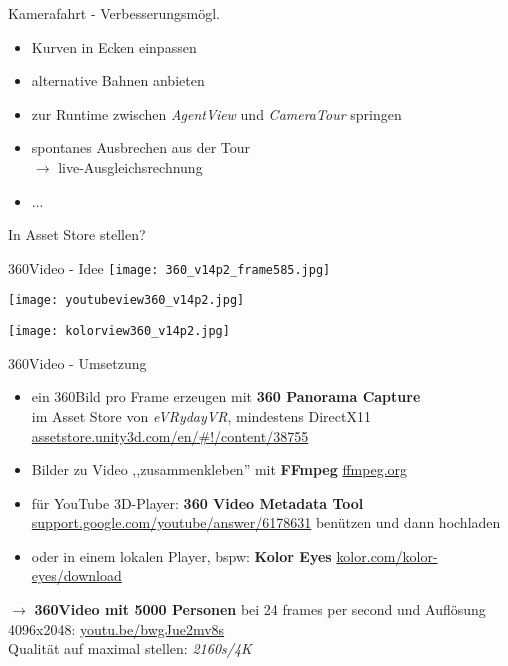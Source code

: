 
\begin{frame}{Kamerafahrt - Verbesserungsmögl.}
	\begin{itemize}
	\setlength\itemsep{1em}
		\pause\item Kurven in Ecken einpassen
		\pause\item alternative Bahnen anbieten
		\pause\item zur Runtime zwischen \textit{AgentView} und \textit{CameraTour} springen
		\pause\item spontanes Ausbrechen aus der Tour\\\pause $\rightarrow$ live-Ausgleichsrechnung
		\pause\item ...
	\end{itemize}
\vspace{0.4cm}
\pause In Asset Store stellen?
\end{frame}


\begin{frame}{360\degree Video - Idee}
	\pause\texttt{[image: 360\_v14p2\_frame585.jpg]}\\
	\begin{minipage}{0.45\textwidth}
			\pause\texttt{[image: youtubeview360\_v14p2.jpg]}
	\end{minipage}\hfill
	\begin{minipage}{0.45\textwidth}
				\pause\texttt{[image: kolorview360\_v14p2.jpg]}
	\end{minipage} \hfill
\end{frame}


\begin{frame}{360\degree  Video - Umsetzung}
	\begin{itemize}
	\setlength\itemsep{1em}
	\pause\item ein 360\degree Bild pro Frame erzeugen \pause mit \textbf{360 Panorama Capture}\\\pause im Asset Store von \textit{eVRydayVR}\pause, mindestens DirectX11 {\tiny\url{assetstore.unity3d.com/en/\#!/content/38755}}
	\pause\item Bilder zu Video ,,zusammenkleben'' mit \pause\textbf{FFmpeg} {\tiny\url{ffmpeg.org}}
	\pause\item für YouTube 3D-Player: \textbf{360 Video Metadata Tool} {\tiny\url{support.google.com/youtube/answer/6178631}} benützen und dann hochladen
	\pause\item oder in einem lokalen Player\pause, bspw: \textbf{Kolor Eyes} {\tiny\url{kolor.com/kolor-eyes/download}}
	\end{itemize}
	\vspace{0.3cm}
	\pause\hspace*{10mm}$\rightarrow$ \textbf{360\degree  Video mit 5000 Personen} bei 24 frames per second und Auflösung 4096x2048: {\color{blue}\url{youtu.be/bwgJue2mv8s}}\\\footnotesize{Qualität auf maximal stellen: \textit{2160s/4K}}
\end{frame}

